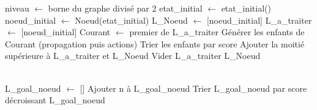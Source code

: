 \documentclass[11pt,a4paper]{article}
\begin{document}
\newpage

\begin{tcolorbox}[colback=green!10!white,colframe=green!95!black]

\begin{algorithm}[H]
\begin{algorithmic}[1]

        \State niveau $\gets$ borne du graphe divisé par 2
        \State etat\_initial $\gets$ etat\_initial()
        \State noeud\_initial $\gets$ Noeud(etat\_initial)
        \State L\_Noeud $\gets$ [noeud\_initial]
        \State L\_a\_traiter $\gets$ [noeud\_initial]
            \State Courant $\gets$ premier de L\_a\_traiter
            \State Générer les enfants de Courant (propagation puis actions)
            \State Trier les enfants par score
            \State Ajouter la moitié supérieure à L\_a\_traiter et L\_Noeud
                \State Vider L\_a\_traiter
            \EndIf
        \EndWhile
        \State \Return L\_Noeud
    \EndFunction

    \\

        \State L\_goal\_noeud $\gets$ []
                \State Ajouter n à L\_goal\_noeud
            \EndIf
        \EndFor
        \State Trier L\_goal\_noeud par score décroissant
        \State \Return L\_goal\_noeud
    \EndFunction

    \\
    
\end{algorithmic}
\end{algorithm}

\end{tcolorbox}
\end{document}
